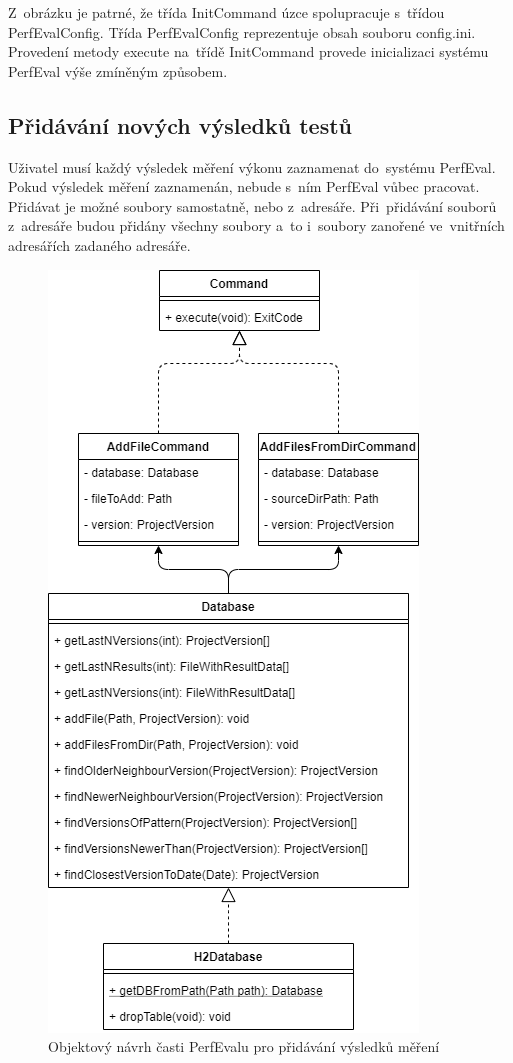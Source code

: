 Z~obrázku je patrné, že třída InitCommand úzce spolupracuje s~třídou PerfEvalConfig. Třída PerfEvalConfig reprezentuje
obsah souboru config.ini. Provedení metody execute na~třídě InitCommand provede inicializaci systému PerfEval výše
zmíněným způsobem.

\subsection{Přidávání nových výsledků testů}

Uživatel musí každý výsledek měření výkonu zaznamenat do~systému PerfEval. Pokud výsledek měření zaznamenán, nebude s~ním
PerfEval vůbec pracovat. Přidávat je možné soubory samostatně, nebo z~adresáře. Při~přidávání souborů z~adresáře budou
přidány všechny soubory a~to i~soubory zanořené ve~vnitřních adresářích zadaného adresáře.

\begin{figure}[!ht]
    \centering
    \includegraphics[height=0.5\textheight]{../img/perfeval_h2db.png}
    \caption{Objektový návrh časti PerfEvalu pro přidávání výsledků měření}
\end{figure}

